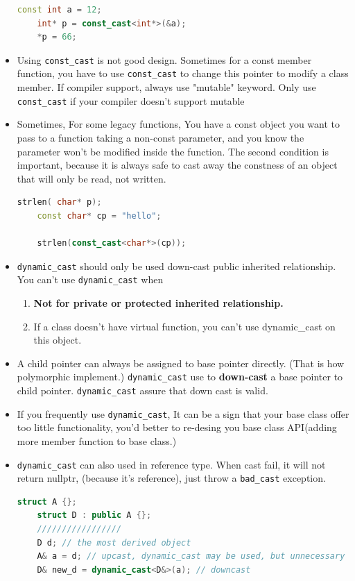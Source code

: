 \documentclass[a4paper,11pt,twoside]{book}
\begin{document}
\begin{itemize}
	\begin{lstlisting}[frame=single, language=c++]
	const int a = 12;
	int* p = const_cast<int*>(&a);
	*p = 66;
	\end{lstlisting}
	
	\item Using \texttt{const\_cast} is not good design. Sometimes for a const member function, you have to use \texttt{const\_cast} to change this pointer to modify a class member. If compiler support, always use "mutable"  keyword.  Only use \texttt{const\_cast} if your compiler doesn't support mutable
	
	\item Sometimes, For some legacy functions, You have a const object you want to pass to a function taking a non-const parameter, and you know the parameter won't be modified inside the function. The second condition is important, because it is always safe to cast away the constness of an object that will only be read, not written.
	
	\begin{lstlisting}[frame=single, language=c++, mathescape=true]
	strlen( char* p);
	const char* cp = "hello";
	
	strlen(const_cast<char*>(cp));
	\end{lstlisting}
	
	\item \texttt{dynamic\_cast} should only be used down-cast public inherited relationship. You can't use \texttt{dynamic\_cast} when
	\begin{enumerate}
		\item \textbf{Not for private or protected inherited relationship.}
		\item If a class doesn't have virtual function, you can't use dynamic\_cast on this object.
	\end{enumerate}
	
	\item A child pointer can always be assigned to base pointer directly. (That is how polymorphic implement.) \texttt{dynamic\_cast} use to \textbf{down-cast} a base pointer to child pointer. \texttt{dynamic\_cast} assure that down cast is valid. 
	
	\item If you frequently use \texttt{dynamic\_cast}, It can be a sign that your base class offer too little functionality, you'd better to re-desing you base class API(adding more member function to base class.)
	
	\item \texttt{dynamic\_cast} can also used in reference type. When cast fail, it will not return nullptr, (because it's reference), just throw a \texttt{bad\_cast} exception.
	\begin{lstlisting}[frame=single, language=c++, mathescape=true]
	struct A {};
	struct D : public A {};
	/////////////////
	D d; // the most derived object
	A& a = d; // upcast, dynamic_cast may be used, but unnecessary
	D& new_d = dynamic_cast<D&>(a); // downcast
	\end{lstlisting}
	

\end{itemize}
\end{document}
